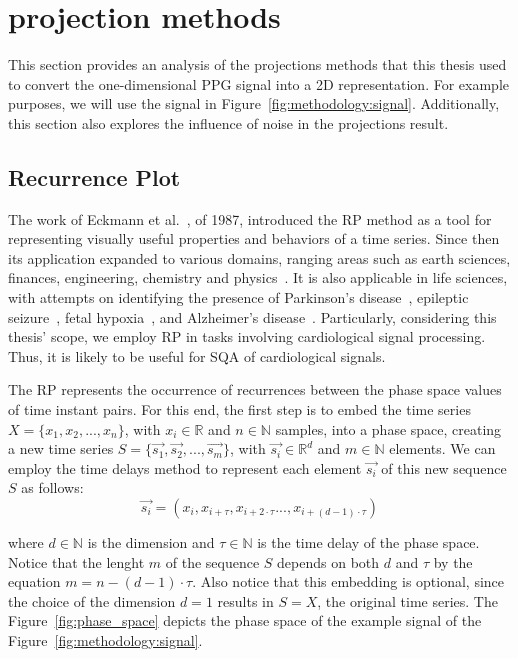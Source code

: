 \section{ projection methods}

This section provides an analysis of the  projections methods that this thesis used to convert the one-dimensional \gls{PPG} signal into a 2D representation. For example purposes, we will use the signal in Figure~\ref{fig:methodology:signal}. Additionally, this section also explores the influence of noise in the projections result. 



\subsection{Recurrence Plot}

The work of Eckmann et al.~\cite{rp-1}, of 1987, introduced the \gls{RP} method as a tool for representing visually useful properties and behaviors of a time series. Since then its application expanded to various domains, ranging areas such as earth sciences, finances, engineering, chemistry and physics~\cite{rp-2}. It is also applicable in life sciences, with attempts on identifying the presence of Parkinson's disease~\cite{rp-3}, epileptic seizure~\cite{rp-4}, fetal hypoxia~\cite{rp-5}, and Alzheimer's disease~\cite{rp-6}. Particularly, considering this thesis' scope, we employ \gls{RP} in tasks involving cardiological signal processing. Thus, it is likely to be useful for \gls{SQA} of cardiological signals.  

The \gls{RP} represents the occurrence of recurrences between the phase space values of time instant pairs. For this end, the first step is to embed the time series $X=\{x_1,x_2,...,x_n\}$, with $ x_i \in \mathbb{R}$ and $n \in \mathbb{N}$ samples, into a phase space, creating a new time series $S=\{\vec{s_1},\vec{s_2},...,\vec{s_m}\}$, with $ \vec{s_i} \in \mathbb{R}^d$ and $m \in \mathbb{N}$ elements. We can employ the time delays method to represent each element $\vec{s_i}$ of this new sequence $S$ as follows:
\begin{equation}
    \vec{s_i} = (x_i, x_{i + \tau}, x_{i + 2\cdot \tau} ..., x_{i + (d-1) \cdot \tau})
\end{equation}   

\noindent where $d \in \mathbb{N}$ is the dimension and $\tau \in \mathbb{N}$ is the time delay of the phase space. Notice that the lenght $m$ of the sequence $S$ depends on both $d$ and $\tau$ by the equation $m = n - (d-1) \cdot \tau$. Also notice that this embedding is optional, since the choice of the dimension $d=1$ results in $S=X$, the original time series. The Figure~\ref{fig:phase_space} depicts the phase space of the example signal of the Figure~\ref{fig:methodology:signal}.

